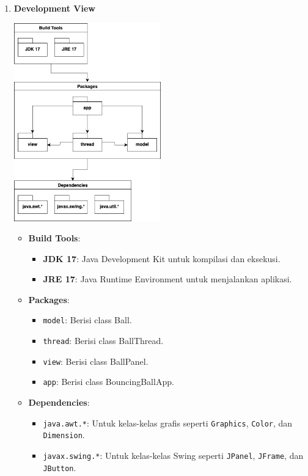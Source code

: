 \documentclass[a4paper]{article}
\begin{document}
\begin{enumerate}[itemsep=1em]
\begin{enumerate}[itemsep=1em]
\begin{itemize}[itemsep=1em]
    \end{itemize}
    \item \textbf{Development View}
    \begin{center}
      \includegraphics[width=0.5\textwidth,keepaspectratio]{bouncing-ball-development-view.png}
    \end{center}
    \begin{itemize}[itemsep=1em]
      \item \textbf{Build Tools}:
      \begin{itemize}
        \item \textbf{JDK 17}: Java Development Kit untuk kompilasi dan eksekusi.
        \item \textbf{JRE 17}: Java Runtime Environment untuk menjalankan aplikasi.
      \end{itemize}
      \item \textbf{Packages}:
      \begin{itemize}
        \item \texttt{model}: Berisi class Ball.
        \item \texttt{thread}: Berisi class BallThread.
        \item \texttt{view}: Berisi class BallPanel.
        \item \texttt{app}: Berisi class BouncingBallApp.
      \end{itemize}
      \item \textbf{Dependencies}:
      \begin{itemize}
        \item \texttt{java.awt.*}: Untuk kelas-kelas grafis seperti \texttt{Graphics}, \texttt{Color}, dan \texttt{Dimension}.
        \item \texttt{javax.swing.*}: Untuk kelas-kelas Swing seperti \texttt{JPanel}, \texttt{JFrame}, dan \texttt{JButton}.

\end{itemize}
\end{itemize}
\end{enumerate}
\end{enumerate}
\end{document}
